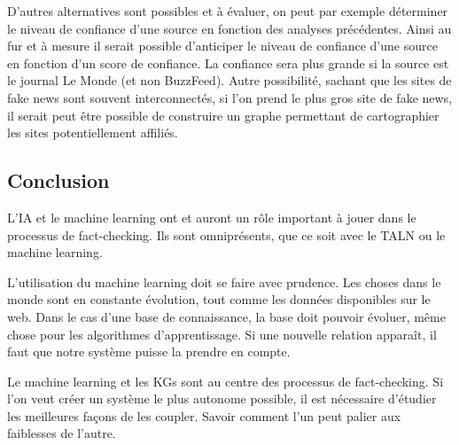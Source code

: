 D'autres alternatives sont possibles et à évaluer, on peut par exemple déterminer le niveau de confiance d'une source en fonction des analyses précédentes. Ainsi au fur et à mesure il serait possible d'anticiper le niveau de confiance d'une source en fonction d'un score de confiance. La confiance sera plus grande si la source est le journal Le Monde (et non BuzzFeed). Autre possibilité, sachant que les sites de fake news sont souvent interconnectés, si l'on prend le plus gros site de fake news, il serait peut être possible de construire un graphe permettant de cartographier les sites potentiellement affiliés.

\subsection{Conclusion}

L'IA et le machine learning ont et auront un rôle important à jouer dans le processus de fact-checking. Ils sont omniprésents, que ce soit avec le TALN ou le machine learning. 

L'utilisation du machine learning doit se faire avec prudence. Les choses dans le monde sont en constante évolution, tout comme les données disponibles sur le web. Dans le cas d'une base de connaissance, la base doit pouvoir évoluer, même chose pour les algorithmes d'apprentissage. Si une nouvelle relation apparaît, il faut que notre système puisse la prendre en compte.

Le machine learning et les KGs sont au centre des processus de fact-checking. Si l'on veut créer un système le plus autonome possible, il est nécessaire d'étudier les meilleures façons de les coupler. Savoir comment l'un peut palier aux faiblesses de l'autre.